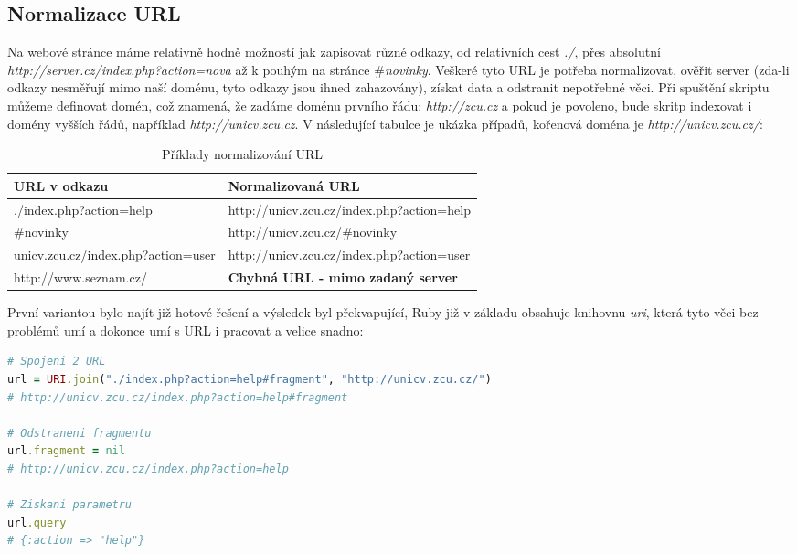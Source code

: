 \documentclass[12pt, a4paper]{report}
\begin{document}
\subsection{Normalizace URL}
Na webové stránce máme relativně hodně možností jak zapisovat různé odkazy, od relativních cest \textit{./}, přes absolutní \textit{http://server.cz/index.php?action=nova} až k pouhým  na stránce \textit{$\#$novinky}. Veškeré tyto URL je potřeba normalizovat, ověřit server (zda-li odkazy nesměřují mimo naší doménu, tyto odkazy jsou ihned zahazovány), získat data a odstranit nepotřebné věci. Při spuštění skriptu můžeme definovat  domén, což znamená, že zadáme doménu prvního řádu: \textit{http://zcu.cz} a pokud je povoleno, bude skritp indexovat i domény vyšších řádů, například \textit{http://unicv.zcu.cz}. V následující tabulce je ukázka případů, kořenová doména je \textit{http://unicv.zcu.cz/}:

\begin{table}[!h]
\centering
\begin{tabular}{|l|l|}
\hline
\bf URL v odkazu & \bf Normalizovaná URL \\
\hline
\hline
./index.php?action=help &  http://unicv.zcu.cz/index.php?action=help \\
\hline
$\#$novinky & http://unicv.zcu.cz/$\#$novinky \\
\hline
unicv.zcu.cz/index.php?action=user & http://unicv.zcu.cz/index.php?action=user \\
\hline
http://www.seznam.cz/ & \bf Chybná URL - mimo zadaný server \\
\hline
\end{tabular}
\label{tab:url}
\caption{Příklady normalizování URL}
\end{table}

První variantou bylo najít již hotové řešení a výsledek byl překvapující, Ruby již v základu obsahuje knihovnu \textit{uri}, která tyto věci bez problémů umí a dokonce umí s URL i pracovat a velice snadno:

\begin{lstlisting}[label=equals_classes,language=Ruby, caption=Normalizování URL přes uri a třídu URI]
# Spojeni 2 URL
url = URI.join("./index.php?action=help#fragment", "http://unicv.zcu.cz/") 
# http://unicv.zcu.cz/index.php?action=help#fragment

# Odstraneni fragmentu
url.fragment = nil
# http://unicv.zcu.cz/index.php?action=help

# Ziskani parametru
url.query
# {:action => "help"}
\end{lstlisting}
\end{document}
